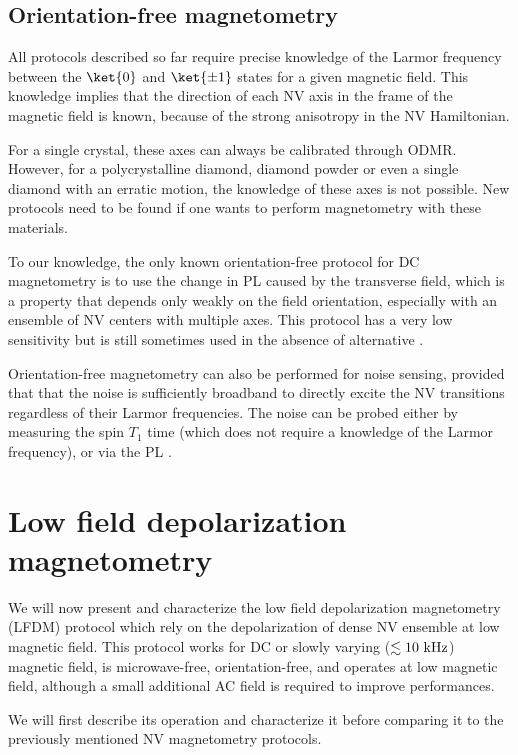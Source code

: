\documentclass[a4paper, 11pt]{report}
\begin{document}
\subsection{Orientation-free magnetometry}
All protocols described so far require precise knowledge of the Larmor frequency between the $\ket{0}$ and $\ket{\pm 1}$ states for a given magnetic field. This knowledge implies that the direction of each NV axis in the frame of the magnetic field is known, because of the strong anisotropy in the NV Hamiltonian. 

For a single crystal, these axes can always be calibrated through ODMR. However, for a polycrystalline diamond, diamond powder or even a single diamond with an erratic motion, the knowledge of these axes is not possible. New protocols need to be found if one wants to perform magnetometry with these materials.

To our knowledge, the only known orientation-free protocol for DC magnetometry is to use the change in PL caused by the transverse field, which is a property that depends only weakly on the field orientation, especially with an ensemble of NV centers with multiple axes. This protocol has a very low sensitivity but is still sometimes used in the absence of alternative \citep{rondin2012nanoscale, tetienne2012magnetic, maletinsky2012robust, chapman2013background, jones2020selective, zhu2022sunlight}.

Orientation-free magnetometry can also be performed for noise sensing, provided that that the noise is sufficiently broadband to directly excite the NV transitions regardless of their Larmor frequencies. The noise can be probed either by measuring the spin $T_1$ time \citep{kolkowitz2015probing, andersen2019electron} (which does not require a knowledge of the Larmor frequency), or via the PL \citep{finco2021imaging}.

\section{Low field depolarization magnetometry}
\label{sec LFDM}
We will now present and characterize the low field depolarization magnetometry (LFDM) protocol which rely on the depolarization of dense NV ensemble at low magnetic field. This protocol works for DC or slowly varying ($\lesssim 10\ \rm kHz$) magnetic field, is microwave-free, orientation-free, and operates at low magnetic field, although a small additional AC field is required to improve performances.

We will first describe its operation and characterize it before comparing it to the previously mentioned NV magnetometry protocols.
\end{document}
